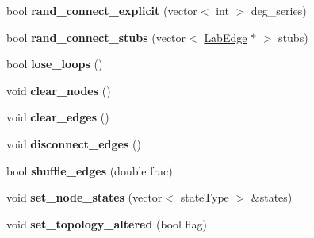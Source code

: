 \begin{DoxyCompactItemize}
\item 
\hypertarget{classelps_1_1_lab_network_ae2f73cfeae43f03b1496a5008510ab4c}{bool {\bfseries rand\-\_\-connect\-\_\-explicit} (vector$<$ int $>$ deg\-\_\-series)}\label{classelps_1_1_lab_network_ae2f73cfeae43f03b1496a5008510ab4c}

\item 
\hypertarget{classelps_1_1_lab_network_a440f5b1ea29d8d532acfb14287decaf7}{bool {\bfseries rand\-\_\-connect\-\_\-stubs} (vector$<$ \hyperlink{classelps_1_1_lab_edge}{Lab\-Edge} $\ast$ $>$ stubs)}\label{classelps_1_1_lab_network_a440f5b1ea29d8d532acfb14287decaf7}

\item 
\hypertarget{classelps_1_1_lab_network_a97a0bcbac94133e1dc26fd31daa635e5}{bool {\bfseries lose\-\_\-loops} ()}\label{classelps_1_1_lab_network_a97a0bcbac94133e1dc26fd31daa635e5}

\item 
\hypertarget{classelps_1_1_lab_network_a8515c29f4800ca575199d9bc1e94d098}{void {\bfseries clear\-\_\-nodes} ()}\label{classelps_1_1_lab_network_a8515c29f4800ca575199d9bc1e94d098}

\item 
\hypertarget{classelps_1_1_lab_network_a2d93d3e030da4c1dc729c55e5ec0ca6d}{void {\bfseries clear\-\_\-edges} ()}\label{classelps_1_1_lab_network_a2d93d3e030da4c1dc729c55e5ec0ca6d}

\item 
\hypertarget{classelps_1_1_lab_network_a83c1ebe216cba0a45e873ddbe6ea69be}{void {\bfseries disconnect\-\_\-edges} ()}\label{classelps_1_1_lab_network_a83c1ebe216cba0a45e873ddbe6ea69be}

\item 
\hypertarget{classelps_1_1_lab_network_a737502a450631377840387e993b53cd3}{bool {\bfseries shuffle\-\_\-edges} (double frac)}\label{classelps_1_1_lab_network_a737502a450631377840387e993b53cd3}

\item 
\hypertarget{classelps_1_1_lab_network_a5c9f04f024b8a71f0c27d2adc3340e4f}{void {\bfseries set\-\_\-node\-\_\-states} (vector$<$ state\-Type $>$ \&states)}\label{classelps_1_1_lab_network_a5c9f04f024b8a71f0c27d2adc3340e4f}

\item 
\hypertarget{classelps_1_1_lab_network_a7bc3da86abcd937f69f3b5d767e5b6f4}{void {\bfseries set\-\_\-topology\-\_\-altered} (bool flag)}\label{classelps_1_1_lab_network_a7bc3da86abcd937f69f3b5d767e5b6f4}


\end{DoxyCompactItemize}
